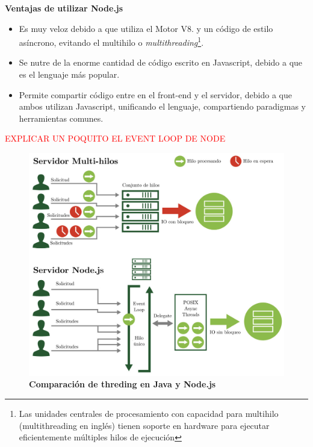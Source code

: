 \vspace{5mm}
\textbf{Ventajas de utilizar Node.js}
\begin{itemize}
    \item Es muy veloz debido a que utiliza el Motor V8. y un código de estilo asíncrono, evitando el multihilo o \textit{multithreading}\footnote{Las unidades centrales de procesamiento con capacidad para multihilo (multithreading en inglés) tienen soporte en hardware para ejecutar eficientemente múltiples hilos de ejecución}.
    \item Se nutre de la enorme cantidad de código escrito en Javascript, debido a que es el lenguaje más popular.
    \item Permite compartir código entre en el front-end y el servidor, debido a que ambos utilizan Javascript, unificando el lenguaje, compartiendo paradigmas y herramientas comunes.
\end{itemize}

\textcolor{red}{EXPLICAR UN POQUITO EL EVENT LOOP DE NODE}

\begin{figure}[h]
    \includegraphics[width=16cm]{Img/Desarrollo/node.jpg}
     \caption{\textbf{ \footnotesize{Comparación de threding en Java y Node.js}}}
     \label{fig:sistemanode}
\end{figure}


